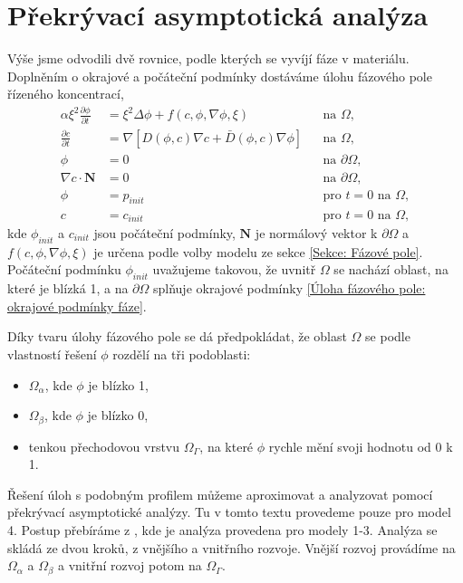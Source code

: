 \section{Překrývací asymptotická analýza}
Výše jsme odvodili dvě rovnice, podle kterých se vyvíjí fáze v materiálu.
Doplněním o okrajové a počáteční podmínky dostáváme úlohu fázového pole řízeného koncentrací,
\begin{subequations}\label{Úloha fázového pole}
    \begin{align}
        \alpha \xi^2 \frac{\partial \phi}{\partial t} &= \xi^2 \Delta \phi + f(c, \phi, \nabla \phi, \xi) &&\text{na \(\Omega\)},\label{Úloha fázového pole: rovnice fáze}\\
        \frac{\partial c}{\partial t} &= \nabla \left[ D(\phi, c) \nabla c + \bar D(\phi, c) \nabla \phi \right] &&\text{na \(\Omega\)},\label{Úloha fázového pole: rovnice koncentrace}\\
        \phi &= 0 &&\text{na \(\partial \Omega\)},\label{Úloha fázového pole: okrajové podmínky fáze}\\
        \nabla c \cdot \mathbf{N} &= 0 &&\text{na \(\partial \Omega\)},\\
        \phi &= p_{init} &&\text{pro \(t = 0\) na \(\Omega\)},\\
        c &= c_{init} &&\text{pro \(t = 0\) na \(\Omega\)},
    \end{align}
\end{subequations}
kde \(\phi_{init}\) a \(c_{init}\) jsou počáteční podmínky, \(\mathbf{N}\) je normálový vektor k \(\partial \Omega\) a \(f(c, \phi, \nabla \phi, \xi)\) je určena podle volby modelu ze sekce \ref{Sekce: Fázové pole}.
Počáteční podmínku \(\phi_{init}\) uvažujeme takovou, že uvnitř \(\Omega\) se nachází oblast, na které je blízká 1, a na \(\partial \Omega\) splňuje okrajové podmínky \eqref{Úloha fázového pole: okrajové podmínky fáze}.

Díky tvaru úlohy fázového pole se dá předpokládat, že oblast \(\Omega\) se podle vlastností řešení \(\phi\) rozdělí na tři podoblasti:
\begin{itemize}
    \item \(\Omega_\alpha\), kde \(\phi\) je blízko 1,
    \item \(\Omega_\beta\), kde \(\phi\) je blízko 0,
    \item tenkou přechodovou vrstvu \(\Omega_\Gamma\), na které \(\phi\) rychle mění svoji hodnotu od 0 k 1.
\end{itemize}
Řešení úloh s podobným profilem můžeme aproximovat a analyzovat pomocí překrývací asymptotické analýzy.
Tu v tomto textu provedeme pouze pro model 4.
Postup přebíráme z \cite{Dvořák_2010}, kde je analýza provedena pro modely 1-3.
Analýza se skládá ze dvou kroků, z vnějšího a vnitřního rozvoje.
Vnější rozvoj provádíme na \(\Omega_\alpha\) a \(\Omega_\beta\) a vnitřní rozvoj potom na \(\Omega_\Gamma\).

